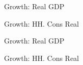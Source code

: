 \documentclass{article}
\begin{document}
 
\begin{figure}[htbp]
\centering
\resizebox{\textwidth}{!}{}
\caption{Growth: Real GDP}
\end{figure}

 
\begin{figure}[htbp]
\centering
\resizebox{\textwidth}{!}{}
\caption{Growth: HH. Cons Real}
\end{figure}

 
\begin{figure}[htbp]
\centering
\resizebox{\textwidth}{!}{}
\caption{Growth: Real GDP}
\end{figure}

 
\begin{figure}[htbp]
\centering
\resizebox{\textwidth}{!}{}
\caption{Growth: HH. Cons Real}
\end{figure}
\end{document}
